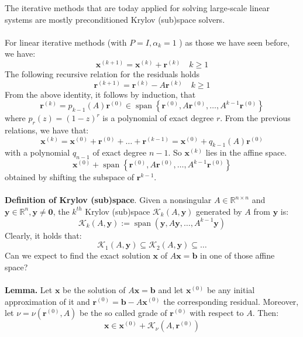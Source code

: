 \documentclass[11pt]{book}
\begin{document}
The iterative methods that are today applied for solving large-scale linear systems are mostly preconditioned Krylov (sub)space solvers.\\ \\
For linear iterative methods (with $P=I, \alpha_{k}=1$ ) as those we have seen before, we have:
$$
\mathbf{x}^{(k+1)}=\mathbf{x}^{(k)}+\mathbf{r}^{(k)} \quad k \geq 1
$$
The following recursive relation for the residuals holds
$$
\mathbf{r}^{(k+1)}=\mathbf{r}^{(k)}-A \mathbf{r}^{(k)} \quad k \geq 1
$$
From the above identity, it follows by induction, that
$$
\mathbf{r}^{(k)}=p_{k-1}(A) \mathbf{r}^{(0)} \in \operatorname{span}\left\{\mathbf{r}^{(0)}, A \mathbf{r}^{(0)}, \ldots, A^{k-1} \mathbf{r}^{(0)}\right\}
$$
where $p_{r}(z)=(1-z)^{r}$ is a polynomial of exact degree $r$.
From the previous relations, we have that:
$$
\mathbf{x}^{(k)}=\mathbf{x}^{(0)}+\mathbf{r}^{(0)}+\ldots+\mathbf{r}^{(k-1)}=\mathbf{x}^{(0)}+q_{k-1}(A) \mathbf{r}^{(0)}
$$
with a polynomial $q_{n-1}$ of exact degree $n-1$.
So $\mathbf{x}^{(k)}$ lies in the affine space.
$$
\mathbf{x}^{(0)}+\operatorname{span}\left\{\mathbf{r}^{(0)}, A \mathbf{r}^{(0)}, \ldots, A^{k-1} \mathbf{r}^{(0)}\right\}
$$
obtained by shifting the subspace of $\mathbf{r}^{k-1}$.\\ \\ 
\textbf{Definition of Krylov (sub)space}. Given a nonsingular $A \in \mathbb{R}^{n \times n}$ and $\mathbf{y} \in \mathbb{R}^{n}, \mathbf{y} \neq \mathbf{0}$, the $k^{th}$ Krylov (sub)space $\mathscr{K}_{k}(A, \mathbf{y})$ generated by $A$ from $\mathbf{y}$ is:
$$
\mathscr{K}_{k}(A, \mathbf{y}):=\operatorname{span}\left(\mathbf{y}, A \mathbf{y}, \ldots, A^{k-1} \mathbf{y}\right)
$$
Clearly, it holds that:
$$\mathscr{K}_{1}(A, \mathbf{y}) \subseteq \mathscr{K}_{2}(A, \mathbf{y}) \subseteq \ldots$$
Can we expect to find the exact solution $\mathbf{x}$ of $A \mathbf{x}=\mathbf{b}$ in one of those affine space?\\ \\
\textbf{Lemma.} Let $\mathbf{x}$ be the solution of $A \mathbf{x}=\mathbf{b}$ and let $\mathbf{x}^{(0)}$ be any initial approximation of it and $\mathbf{r}^{(0)}=\mathbf{b}-A \mathbf{x}^{(0)}$ the corresponding residual. Moreover, let $\nu=\nu\left(\mathbf{r}^{(0)}, A\right)$ be the so called grade of $\mathbf{r}^{(0)}$ with respect to $A$. Then:
$$
\mathbf{x} \in \mathbf{x}^{(0)}+\mathscr{K}_{\nu}\left(A, \mathbf{r}^{(0)}\right)
$$
\end{document}
